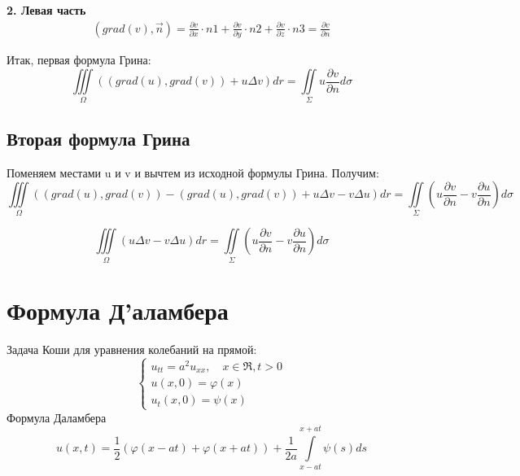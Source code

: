 \documentclass[11pt,a4paper]{article}
\begin{document}
\textbf{2. Левая часть} \\
\begin{equation}
\begin{split}
(grad(v), \vec{n}) = \frac{\partial v}{\partial x} \cdot n1 + \frac{\partial v}{\partial y} \cdot n2 + \frac{\partial v}{\partial z} \cdot n3 = \frac{\partial v}{\partial n}
\end{split}
\end{equation}

Итак, первая формула Грина:
$$
\iiint \limits_{\varOmega} ((grad(u), grad(v)) + u\Delta v)dr = \iint \limits_{\Sigma} u  \frac{\partial v}{\partial n} d\sigma
$$

\subsection{Вторая формула Грина}
Поменяем местами u и v и вычтем из исходной формулы Грина. Получим:
$$
\iiint \limits_{\varOmega} ((grad(u), grad(v)) - (grad(u), grad(v)) + u\Delta v -  v\Delta u)dr = \iint \limits_{\Sigma} (u  \frac{\partial v}{\partial n} -  v  \frac{\partial u}{\partial n}) d\sigma
$$

$$
\iiint \limits_{\varOmega} (u\Delta v -  v\Delta u)dr = \iint \limits_{\Sigma} (u\frac{\partial v}{\partial n} -  v  \frac{\partial u}{\partial n}) d\sigma
$$

\section{Формула Д'аламбера}
Задача Коши для уравнения колебаний на прямой:
$$
\begin{cases}
	u_{tt} = a^2u_{xx}, \quad x \in \Re, t > 0\\
	u(x,0) = \varphi(x) \\
	u_t(x,0) = \psi(x)
\end{cases}
$$
Формула Даламбера
$$
u(x,t) = \frac{1}{2}(\varphi(x-at) + \varphi(x+at)) + \frac{1}{2a} \int\limits_{x-at}^{x+at} \psi(s)ds
$$
\end{document}
